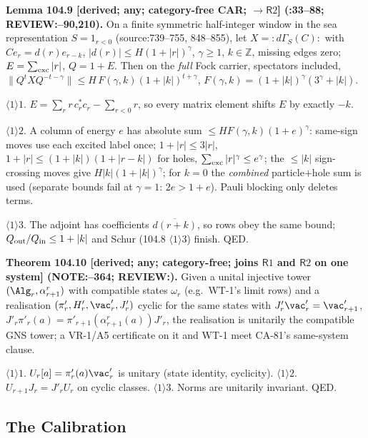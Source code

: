 \textbf{Lemma 104.9 [derived; any; category-free CAR; \(\to\mathsf R2\)] (:33--88; REVIEW:--90,210).}
On a finite symmetric half-integer window in the sea representation \(S=1_{r<0}\) (source:739--755, 848--855), let
\(X={:}d\Gamma_S(C){:}\) with \(Ce_r=d(r)e_{r-k}\), \(|d(r)|\le H(1+|r|)^\gamma\), \(\gamma\ge1\), \(k\in\mathbb Z\), missing edges zero;
\(E=\sum_{\rm exc}|r|\), \(Q=1+E\). Then on the \emph{full} Fock carrier, spectators included,
\(\|Q^tXQ^{-t-\gamma}\|\le H\,F(\gamma,k)(1+|k|)^{t+\gamma}\), \(F(\gamma,k)=(1+|k|)^\gamma(3^\gamma+|k|)\).
\par\(\langle1\rangle1\). \(E=\sum_rr\,c_r^*c_r-\sum_{r<0}r\), so every matrix element shifts \(E\) by exactly \(-k\).
\par\(\langle1\rangle2\). A column of energy \(e\) has absolute sum \(\le HF(\gamma,k)(1+e)^\gamma\): same-sign moves use each excited label once; \(1+|r|\le3|r|\),
\(1+|r|\le(1+|k|)(1+|r-k|)\) for holes, \(\sum_{\rm exc}|r|^\gamma\le e^\gamma\); the \(\le|k|\) sign-crossing moves give \(H|k|(1+|k|)^\gamma\);
for \(k=0\) the \emph{combined} particle\(+\)hole sum is used (separate bounds fail at \(\gamma=1\): \(2e>1+e\)). Pauli blocking only deletes terms.
\par\(\langle1\rangle3\). The adjoint has coefficients \(\overline{d(r+k)}\), so rows obey the same bound; \(Q_{\rm out}/Q_{\rm in}\le1+|k|\) and Schur (104.8 \(\langle1\rangle3\)) finish. QED.

\textbf{Theorem 104.10 [derived; any; category-free; joins \(\mathsf R1\) and \(\mathsf R2\) on one system] (NOTE:--364; REVIEW:).}
Given a unital injective tower \((\Alg_r,\alpha^r_{r+1})\) with compatible states \(\omega_r\) (e.g.\ WT-1's limit rows) and a
realisation \((\pi'_r,H'_r,\vac'_r,J'_r)\) cyclic for the same states with \(J'_r\vac'_r=\vac'_{r+1}\),
\(J'_r\pi'_r(a)=\pi'_{r+1}(\alpha^r_{r+1}(a))J'_r\), the realisation is unitarily the compatible GNS tower; a VR-1/A5
certificate on it and WT-1 meet CA-81's same-system clause. \par\(\langle1\rangle1\). \(U_r[a]=\pi'_r(a)\vac'_r\) is unitary
(state identity, cyclicity). \(\langle1\rangle2\). \(U_{r+1}J_r=J'_rU_r\) on cyclic classes. \(\langle1\rangle3\). Norms are unitarily invariant. QED.

\subsection{The Calibration}

